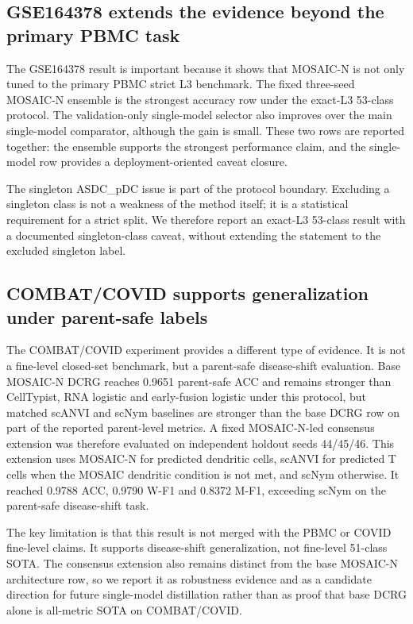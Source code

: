 \documentclass[unnumsec,webpdf,contemporary,large,numbered]{oup-authoring-template}
\begin{document}
\subsection{GSE164378 extends the evidence beyond the primary PBMC task}

The GSE164378 result is important because it shows that MOSAIC-N is not only tuned to the primary PBMC strict L3 benchmark. The fixed three-seed MOSAIC-N ensemble is the strongest accuracy row under the exact-L3 53-class protocol. The validation-only single-model selector also improves over the main single-model comparator, although the gain is small. These two rows are reported together: the ensemble supports the strongest performance claim, and the single-model row provides a deployment-oriented caveat closure.

The singleton ASDC\_pDC issue is part of the protocol boundary. Excluding a singleton class is not a weakness of the method itself; it is a statistical requirement for a strict split. We therefore report an exact-L3 53-class result with a documented singleton-class caveat, without extending the statement to the excluded singleton label.

\subsection{COMBAT/COVID supports generalization under parent-safe labels}

The COMBAT/COVID experiment provides a different type of evidence. It is not a fine-level closed-set benchmark, but a parent-safe disease-shift evaluation. Base MOSAIC-N DCRG reaches 0.9651 parent-safe ACC and remains stronger than CellTypist, RNA logistic and early-fusion logistic under this protocol, but matched scANVI and scNym baselines are stronger than the base DCRG row on part of the reported parent-level metrics. A fixed MOSAIC-N-led consensus extension was therefore evaluated on independent holdout seeds 44/45/46. This extension uses MOSAIC-N for predicted dendritic cells, scANVI for predicted T cells when the MOSAIC dendritic condition is not met, and scNym otherwise. It reached 0.9788 ACC, 0.9790 W-F1 and 0.8372 M-F1, exceeding scNym on the parent-safe disease-shift task.

The key limitation is that this result is not merged with the PBMC or COVID fine-level claims. It supports disease-shift generalization, not fine-level 51-class SOTA. The consensus extension also remains distinct from the base MOSAIC-N architecture row, so we report it as robustness evidence and as a candidate direction for future single-model distillation rather than as proof that base DCRG alone is all-metric SOTA on COMBAT/COVID.
\end{document}
